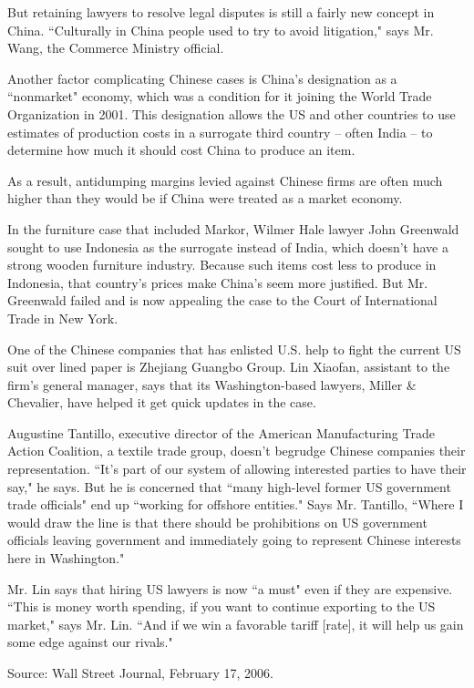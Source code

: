 \documentclass[letterpaper,12pt]{article}
\begin{document}
But retaining lawyers to resolve legal disputes is still a fairly new concept in China. ``Culturally in China people used to try to avoid litigation," says Mr. Wang, the Commerce Ministry official.

Another factor complicating Chinese cases is China's designation as a ``nonmarket" economy, which was a condition for it joining the World Trade Organization in 2001. This designation allows the US and other countries to use estimates of production costs in a surrogate third country -- often India -- to determine how much it should cost China to produce an item.

As a result, antidumping margins levied against Chinese firms are often much higher than they would be if China were treated as a market economy.

In the furniture case that included Markor, Wilmer Hale lawyer John Greenwald sought to use Indonesia as the surrogate instead of India, which doesn't have a strong wooden furniture industry. Because such items cost less to produce in Indonesia, that country's prices make China's seem more justified. But Mr. Greenwald failed and is now appealing the case to the Court of International Trade in New York.

One of the Chinese companies that has enlisted U.S. help to fight the current US suit over lined paper is Zhejiang Guangbo Group. Lin Xiaofan, assistant to the firm's general manager, says that its Washington-based lawyers, Miller \& Chevalier, have helped it get quick updates in the case.

Augustine Tantillo, executive director of the American Manufacturing Trade Action Coalition, a textile trade group, doesn't begrudge Chinese companies their representation. ``It's part of our system of allowing interested parties to have their say," he says. But he is concerned that ``many high-level former US government trade officials" end up ``working for offshore entities." Says Mr. Tantillo, ``Where I would draw the line is that there should be prohibitions on US government officials leaving government and immediately going to represent Chinese interests here in Washington."

Mr. Lin says that hiring US lawyers is now ``a must" even if they are expensive. ``This is money worth spending, if you want to continue exporting to the US market," says Mr. Lin. ``And if we win a favorable tariff [rate], it will help us gain some edge against our rivals."

Source:  Wall Street Journal, February 17, 2006.  
\end{document}
